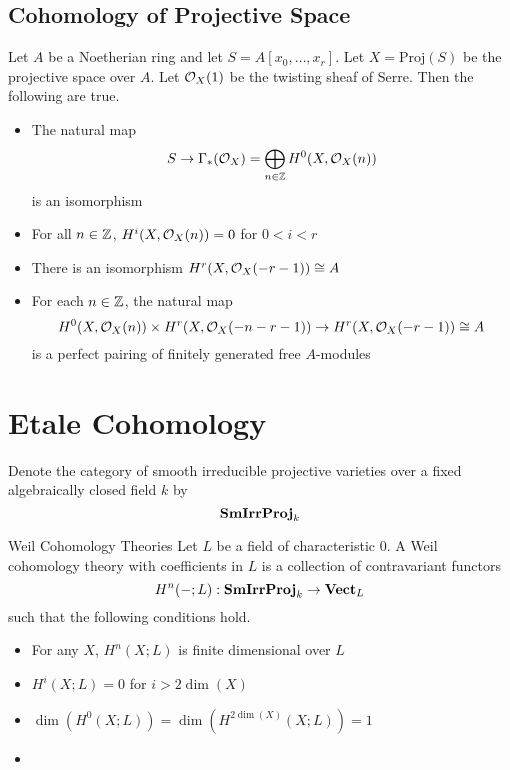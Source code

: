 \documentclass[a4paper]{article}
\begin{document}
\subsection{Cohomology of Projective Space}
\begin{thm}{}{} Let $A$ be a Noetherian ring and let $S=A[x_0,\dots,x_r]$. Let $X=\text{Proj}(S)$ be the projective space over $A$. Let $\mathcal{O}_X(1)$ be the twisting sheaf of Serre. Then the following are true. 
\begin{itemize}
\item The natural map $$S\to\Gamma_\ast(\mathcal{O}_X)=\bigoplus_{n\in\mathbb{Z}}H^0(X,\mathcal{O}_X(n))$$ is an isomorphism
\item For all $n\in\mathbb{Z}$, $H^i(X,\mathcal{O}_X(n))=0$ for $0<i<r$
\item There is an isomorphism $H^r(X,\mathcal{O}_X(-r-1))\cong A$
\item For each $n\in\mathbb{Z}$, the natural map $$H^0(X,\mathcal{O}_X(n))\times H^r(X,\mathcal{O}_X(-n-r-1))\to H^r(X,\mathcal{O}_X(-r-1))\cong A$$ is a perfect pairing of finitely generated free $A$-modules
\end{itemize}
\end{thm}

\pagebreak
\section{Etale Cohomology}
Denote the category of smooth irreducible projective varieties over a fixed algebraically closed field $k$ by $$\bold{SmIrrProj}_k$$

\begin{defn}{Weil Cohomology Theories}{} Let $L$ be a field of characteristic $0$. A Weil cohomology theory with coefficients in $L$ is a collection of contravariant functors $$H^n(-;L):\bold{SmIrrProj}_k\to\bold{Vect}_L$$ such that the following conditions hold. 
\begin{itemize}
\item For any $X$, $H^n(X;L)$ is finite dimensional over $L$
\item $H^i(X;L)=0$ for $i>2\dim(X)$
\item $\dim(H^0(X;L))=\dim(H^{2\dim(X)}(X;L))=1$
\item 
\end{itemize}
\end{defn}
\end{document}
